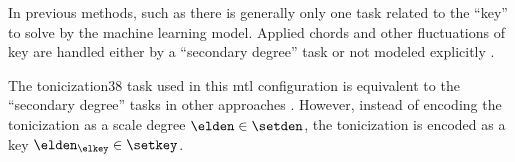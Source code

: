 
In previous methods, such as \textcite{chen2018functional,
chen2019harmony, micchi2020not, micchi2021deep,
mcleod2021modular} there is generally only one task related
to the ``key'' to solve by the machine learning model.
Applied chords and other fluctuations of key are handled
either by a ``secondary degree'' task
\parencite{chen2021attend, micchi2021deep} or not modeled
explicitly \parencite{mcleod2021modular}.

The \gls{tonicization38} task used in this \gls{mtl}
configuration is equivalent to the ``secondary degree''
tasks in other approaches
\parencite{chen2021attend,micchi2021deep}. However, instead
of encoding the tonicization as a scale degree $\elden \in
\setden$, the tonicization is encoded as a key
$\elden_\elkey \in \setkey$. 

